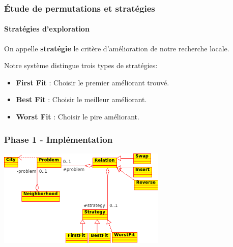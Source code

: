 \documentclass{beamer}
\begin{document}
\begin{frame}
  \frametitle{Étude de permutations et stratégies}
  \framesubtitle{Stratégies d'exploration}
  \begin{definition}
    On appelle \textbf{stratégie} le critère d'amélioration de notre recherche
locale.
  \end{definition}

  
  Notre système distingue trois types de stratégies:
  \begin{itemize}
   \item \textbf{First Fit} : Choisir le premier améliorant trouvé.
   \item \textbf{Best Fit} : Choisir le meilleur améliorant.
   \item \textbf{Worst Fit} : Choisir le pire améliorant.
  \end{itemize}

\end{frame}



\begin{frame}
  \frametitle{Phase 1 - Implémentation}
  
  \begin{center}
    \includegraphics[width=0.6\textwidth,height=0.6\textheight]{../UML/crs.png}
  \end{center}
  
\end{frame}
\end{document}
